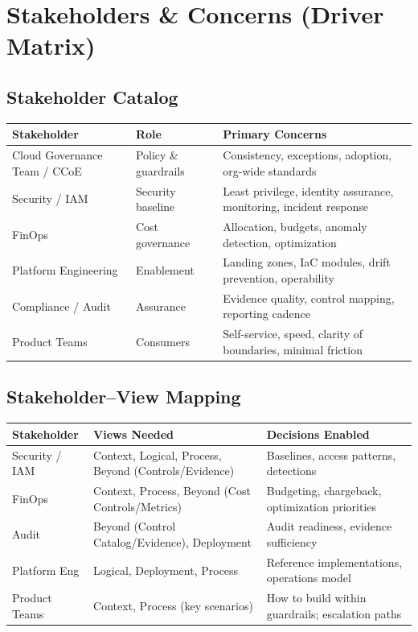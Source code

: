 \documentclass[11pt]{report}
\begin{document}
\section{Stakeholders \& Concerns (Driver Matrix)}
\subsection{Stakeholder Catalog}
\begin{tabularx}{\textwidth}{@{}l l >{\raggedright\arraybackslash}X@{}}
\toprule
\textbf{Stakeholder} & \textbf{Role} & \textbf{Primary Concerns} \\
\midrule
Cloud Governance Team / CCoE & Policy \& guardrails & Consistency, exceptions, adoption, org-wide standards \\
Security / IAM & Security baseline & Least privilege, identity assurance, monitoring, incident response \\
FinOps & Cost governance & Allocation, budgets, anomaly detection, optimization \\
Platform Engineering & Enablement & Landing zones, IaC modules, drift prevention, operability \\
Compliance / Audit & Assurance & Evidence quality, control mapping, reporting cadence \\
Product Teams & Consumers & Self-service, speed, clarity of boundaries, minimal friction \\
\bottomrule
\end{tabularx}

\subsection{Stakeholder--View Mapping}
\begin{tabularx}{\textwidth}{@{}l >{\raggedright\arraybackslash}X >{\raggedright\arraybackslash}X@{}}
\toprule
\textbf{Stakeholder} & \textbf{Views Needed} & \textbf{Decisions Enabled} \\
\midrule
Security / IAM & Context, Logical, Process, Beyond (Controls/Evidence) & Baselines, access patterns, detections \\
FinOps & Context, Process, Beyond (Cost Controls/Metrics) & Budgeting, chargeback, optimization priorities \\
Audit & Beyond (Control Catalog/Evidence), Deployment & Audit readiness, evidence sufficiency \\
Platform Eng & Logical, Deployment, Process & Reference implementations, operations model \\
Product Teams & Context, Process (key scenarios) & How to build within guardrails; escalation paths \\
\bottomrule
\end{tabularx}
\end{document}
